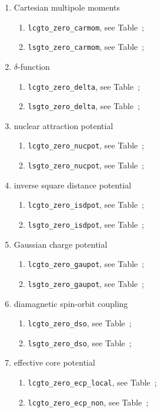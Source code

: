 \documentclass[a4paper,11pt,twoside,openright]{book}
\begin{document}
\begin{enumerate}
  \begin{enumerate}
    \item Cartesian multipole moments
    \begin{enumerate}
      \item \verb|lcgto_zero_carmom|, see Table~;
      \item \verb|lsgto_zero_carmom|, see Table~;
    \end{enumerate}
    \item $\delta$-function
    \begin{enumerate}
      \item \verb|lcgto_zero_delta|, see Table~;
      \item \verb|lsgto_zero_delta|, see Table~;
    \end{enumerate}
    \item nuclear attraction potential
    \begin{enumerate}
      \item \verb|lcgto_zero_nucpot|, see Table~;
      \item \verb|lsgto_zero_nucpot|, see Table~;
    \end{enumerate}
    \item inverse square distance potential
    \begin{enumerate}
      \item \verb|lcgto_zero_isdpot|, see Table~;
      \item \verb|lsgto_zero_isdpot|, see Table~;
    \end{enumerate}
    \item Gaussian charge potential
    \begin{enumerate}
      \item \verb|lcgto_zero_gaupot|, see Table~;
      \item \verb|lsgto_zero_gaupot|, see Table~;
    \end{enumerate}
    \item diamagnetic spin-orbit coupling
    \begin{enumerate}
      \item \verb|lcgto_zero_dso|, see Table~;
      \item \verb|lsgto_zero_dso|, see Table~;
    \end{enumerate}
    \item effective core potential
    \begin{enumerate}
      \item \verb|lcgto_zero_ecp_local|, see Table~;
      \item \verb|lcgto_zero_ecp_non|, see Table~;

\end{enumerate}
\end{enumerate}
\end{enumerate}
\end{document}
